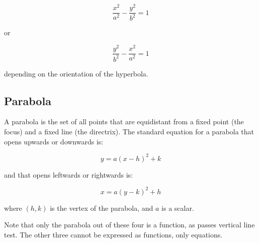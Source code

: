 \begin{equation}
\frac{x^2}{a^2} - \frac{y^2}{b^2} = 1
\end{equation}

or

\begin{equation}
\frac{y^2}{b^2} - \frac{x^2}{a^2} = 1
\end{equation}

depending on the orientation of the hyperbola.



\subsection{Parabola}

A parabola is the set of all points that are equidistant from a fixed
point (the focus) and a fixed line (the directrix). The standard
equation for a parabola that opens upwards or downwards is:

\begin{equation}
y = a(x - h)^2 + k
\end{equation}

and that opens leftwards or rightwards is:

\begin{equation}
x = a(y - k)^2 + h
\end{equation}

\begin{center}
  
\end{center}


where $(h,k)$ is the vertex of the parabola, and $a$ is a scalar.

Note that only the parabola out of these four is a function, as passes vertical line test. The other three cannot be expressed as functions, only equations.
